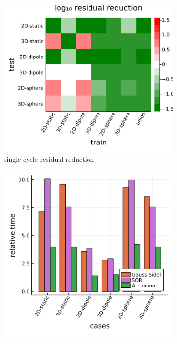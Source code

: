 \documentclass[review]{elsarticle}
\begin{document}
\begin{figure}
    \centering
    \begin{subfigure}[b]{0.47\textwidth}
        \centering
        \includegraphics[width=\textwidth]{figures/crossloss.png}
        \caption{single-cycle residual reduction}
        \label{fig:cross plot}
    \end{subfigure}
    \hfill
    \begin{subfigure}[b]{0.47\textwidth}
        \centering
        \includegraphics[width=\textwidth]{figures/synthetic_timing.png}

\end{subfigure}
\end{figure}
\end{document}
